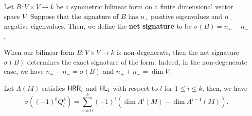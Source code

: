 \documentclass{puthesis-UG}
\begin{document}
\begin{defn} \label{def:net-signature}
	Let $B : V \times V \to k$ be a symmetric bilinear form on a finite dimensional vector space $V$. Suppose that the signature of $B$ has $n_+$ positive eigenvalues and $n_-$ negative eigenvalues. Then, we define the \textbf{net signature} to be $\sigma(B) = n_+ - n_-$. 
\end{defn}

When our bilinear form $B : V \times V \to k$ is non-degenerate, then the net signature $\sigma (B)$ determines the exact signature of the form. Indeed, in the non-degenerate case, we have $n_+ - n_- = \sigma(B)$ and $n_+ + n_- = \dim V$. 
\begin{lem} \label{formula-for-dimension-when-HRR-HL-are-satisfied}
	Let $A(M)$ satisfies $\mathsf{HRR}_i$ and $\mathsf{HL}_i$ with respect to $l$ for $1 \leq i \leq k$, then, we have 
	\[
		\sigma \left ( (-1)^kQ_l^k \right ) = \sum_{i = 0}^k (-1)^i (\dim A^i(M) - \dim A^{i-1}(M)).
	\]
\end{lem}
\end{document}
